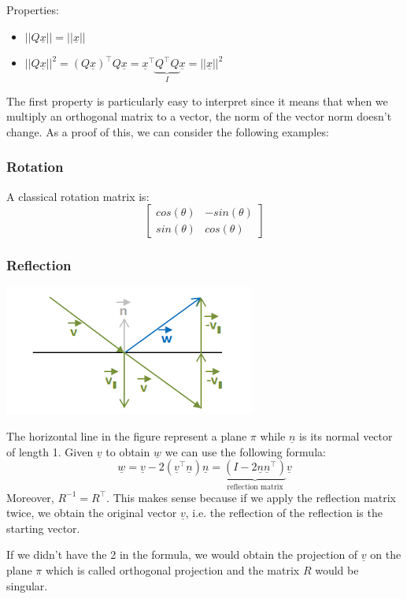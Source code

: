 Properties:
\begin{itemize}
    \item $||Q\underline{x}|| = ||\underline{x}||$
    \item $||Q\underline{x}||^2 = (Q\underline{x})^\intercal Q\underline{x} = \underline{x}^\intercal \underbrace{Q^\intercal Q}_{I} \underline{x} = ||\underline{x}||^2$
\end{itemize}
The first property is particularly easy to interpret since it means that when we multiply an orthogonal matrix to a vector, the norm of the vector norm doesn't change. As a proof of this, we can consider the following examples:

\subsubsection*{Rotation}
A classical rotation matrix is:
\[
\begin{bmatrix}
    cos(\theta) & -sin(\theta)\\
    sin(\theta) & cos(\theta)
\end{bmatrix}    
\]
\subsubsection*{Reflection}
\begin{center}
    \includegraphics[scale=0.5]{../images/Reflection.png}
\end{center}
The horizontal line in the figure represent a plane $\pi$ while $\underline{n}$ is its normal vector of length 1. 
Given $\underline{v}$ to obtain $\underline{w}$ we can use the following formula:
\[
\underline{w} = \underline{v} - 2(\underline{v}^\intercal \underline{n})\underline{n} = \underbrace{(I - 2\underline{n}\underline{n}^\intercal)}_{\text{reflection matrix}}\underline{v}
\]
Moreover, $R^{-1} = R^\intercal$. This makes sense because if we apply the reflection matrix twice, we obtain the original vector $\underline{v}$, i.e. the reflection of the reflection is the starting vector.

If we didn't have the 2 in the formula, we would obtain the projection of $\underline{v}$ on the plane $\pi$ which is called orthogonal projection and the matrix $R$ would be singular. \\

